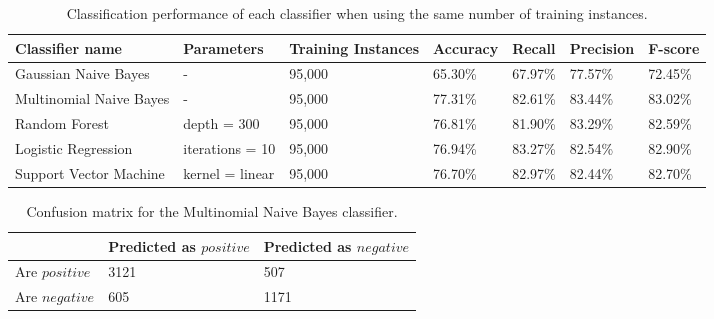 \begin{table}
\centering
\caption{Classification performance of each classifier when using the same number of training instances.}
\begin{tabular}{ |p{3cm}||p{3cm}|p{2cm}|p{1.5cm}|p{1.5cm}|p{1.5cm}|p{1.5cm}| }
 \hline
 Classifier name &       Parameters &    Training Instances &Accuracy &  Recall &     Precision& F-score \\
 \hline
 Gaussian Naive Bayes &-&     95,000&                 65.30\%& 67.97\%&       77.57\%& 72.45\%\\
  \hline
 Multinomial Naive Bayes  &-&     95,000& 77.31\%&        82.61\%&       83.44\%& 83.02\%\\
  \hline
 Random Forest              &depth = 300&            95,000&76.81\%&  81.90\%&     83.29\%& 82.59\%\\
  \hline
 Logistic Regression        &iterations = 10&   95,000&    76.94\%&        83.27\%&   82.54\%& 82.90\%\\
  \hline
 Support Vector Machine     &kernel = linear&   95,000&     76.70\%& 82.97\%&  82.44\%& 82.70\%\\
 \hline
\end{tabular}
\label{tab:evaluations_euqal}
\end{table}
\begin{table}
\centering
\caption{Confusion matrix for the Multinomial Naive Bayes classifier.}
\begin{tabular}{ |p{3cm}||p{3cm}|p{3cm}| }
 \hline
  &          Predicted as $positive$ &Predicted as $negative$  \\
 \hline
 Are $positive$        & 3121&            507\\
  \hline
 Are $negative$  &605&                     1171\\
 \hline

\end{tabular}
\label{tab:evaluations_conf}
\end{table}
